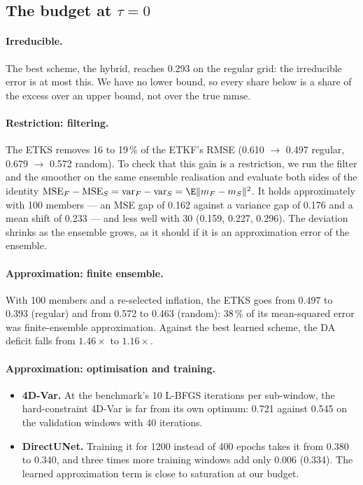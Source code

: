 \subsection{The budget at \texorpdfstring{$\tau = 0$}{tau = 0}}\label{sec:q1-budget}

\paragraph{Irreducible.}
The best scheme, the hybrid, reaches 0.293 on the regular grid: the irreducible
error is at most this. We have no lower bound, so every share below is a share of
the excess over an upper bound, not over the true $\mathrm{mmse}$.

\paragraph{Restriction: filtering.}
The ETKS removes 16 to 19\,\% of the ETKF's RMSE (0.610 $\to$ 0.497 regular,
0.679 $\to$ 0.572 random). To check that this gain is a restriction, we run the
filter and the smoother on the same ensemble realisation and evaluate both sides
of the identity
$\mathrm{MSE}_F - \mathrm{MSE}_S = \mathrm{var}_F - \mathrm{var}_S = \E\|m_F - m_S\|^2$.
It holds approximately with 100 members --- an MSE gap of 0.162 against a
variance gap of 0.176 and a mean shift of 0.233 --- and less well with 30
(0.159, 0.227, 0.296). The deviation shrinks as the ensemble grows, as it should
if it is an approximation error of the ensemble.

\paragraph{Approximation: finite ensemble.}
With 100 members and a re-selected inflation, the ETKS goes from 0.497 to 0.393
(regular) and from 0.572 to 0.463 (random): 38\,\% of its mean-squared error was
finite-ensemble approximation. Against the best learned scheme, the DA deficit
falls from $1.46\times$ to $1.16\times$.

\paragraph{Approximation: optimisation and training.}
\begin{itemize}[leftmargin=*,nosep]
  \item \textbf{4D-Var.} At the benchmark's 10 L-BFGS iterations per sub-window,
    the hard-constraint 4D-Var is far from its own optimum: 0.721 against 0.545
    on the validation windows with 40 iterations.
  \item \textbf{DirectUNet.} Training it for 1200 instead of 400 epochs takes it
    from 0.380 to 0.340, and three times more training windows add only 0.006
    (0.334). The learned approximation term is close to saturation at our
    budget.
\end{itemize}

